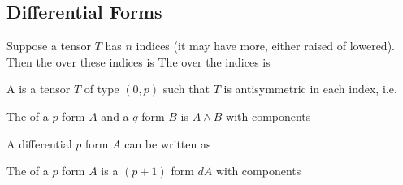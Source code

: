 \documentclass{article}
\begin{document}
\subsection{Differential Forms}

\begin{definition}[Symmetrisation]
Suppose a tensor $T$ has $n$ indices (it may have more, either raised of lowered). Then the  over these indices is 
The  over the indices is 
\end{definition}

\begin{definition}
A  is a tensor $T$ of type $(0,p)$ such that $T$ is antisymmetric in each index, i.e. 
\end{definition}

\begin{definition}
The  of a $p$ form $A$ and a $q$ form $B$ is $A \wedge B$ with components 
\end{definition}

\begin{lemma}
\end{lemma}

\begin{lemma}
A differential $p$ form $A$ can be written as 
\end{lemma}

\begin{definition}
The  of a $p$ form $A$ is a $(p+1)$ form $dA$ with components 
\end{definition}

\begin{lemma}
\end{lemma}

\begin{definition}
\end{definition}
\end{document}
